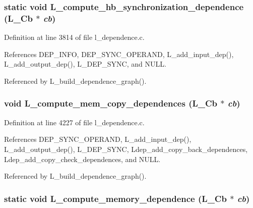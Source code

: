 \subsubsection{\setlength{\rightskip}{0pt plus 5cm}static void L\_\-compute\_\-hb\_\-synchronization\_\-dependence (L\_\-Cb $\ast$ {\em cb})\hspace{0.3cm}{\tt  [static]}}\label{l__dependence_8c_027c6769ca5eacf63ffd6121574cebf9}




Definition at line 3814 of file l\_\-dependence.c.

References DEP\_\-INFO, DEP\_\-SYNC\_\-OPERAND, L\_\-add\_\-input\_\-dep(), L\_\-add\_\-output\_\-dep(), L\_\-DEP\_\-SYNC, and NULL.

Referenced by L\_\-build\_\-dependence\_\-graph().
\subsubsection{\setlength{\rightskip}{0pt plus 5cm}void L\_\-compute\_\-mem\_\-copy\_\-dependences (L\_\-Cb $\ast$ {\em cb})}\label{l__dependence_8c_bdce56f36cb41bb9afab71582742e1d3}




Definition at line 4227 of file l\_\-dependence.c.

References DEP\_\-SYNC\_\-OPERAND, L\_\-add\_\-input\_\-dep(), L\_\-add\_\-output\_\-dep(), L\_\-DEP\_\-SYNC, Ldep\_\-add\_\-copy\_\-back\_\-dependences, Ldep\_\-add\_\-copy\_\-check\_\-dependences, and NULL.

Referenced by L\_\-build\_\-dependence\_\-graph().
\subsubsection{\setlength{\rightskip}{0pt plus 5cm}static void L\_\-compute\_\-memory\_\-dependence (L\_\-Cb $\ast$ {\em cb})\hspace{0.3cm}{\tt  [static]}}\label{l__dependence_8c_12c318e082de47185dec0af388596878}




